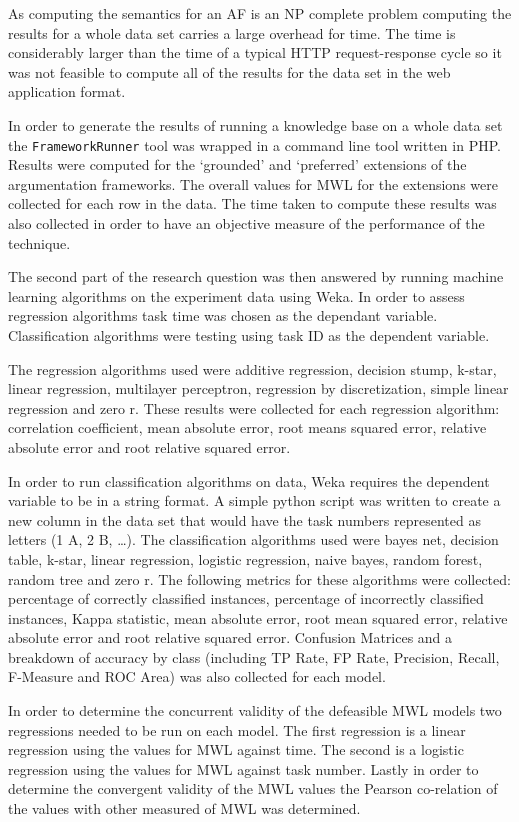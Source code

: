As computing the semantics for an AF is an NP complete problem computing the results for a whole data set carries a large overhead for time. The time is considerably larger than the time of a typical HTTP request-response cycle so it was not feasible to compute all of the results for the data set in the web application format. 

In order to generate the results of running a knowledge base on a whole data set the \lstinline{FrameworkRunner} tool was wrapped in a command line tool written in PHP. Results were computed for the `grounded' and `preferred' extensions of the argumentation frameworks. The overall values for MWL for the extensions were collected for each row in the data. The time taken to compute these results was also collected in order to have an objective measure of the performance of the technique.

The second part of the research question was then answered by running machine learning algorithms on the experiment data using Weka. In order to assess regression algorithms task time was chosen as the dependant variable. Classification algorithms were testing using task ID as the dependent variable.

The regression algorithms used were additive regression, decision stump, k-star, linear regression, multilayer perceptron, regression by discretization, simple linear regression and zero r.
These results were collected for each regression algorithm: correlation coefficient, mean absolute error, root means squared error, relative absolute error and root relative squared error.

In order to run classification algorithms on data, Weka requires the dependent variable to be in a string format. A simple python script was written to create a new column in the data set that would have the task numbers represented as letters (1 \leftarrow A, 2 \leftarrow B, \ldots).
The classification algorithms used were bayes net, decision table, k-star, linear regression, logistic regression, naive bayes, random forest, random tree and zero r. The following metrics for these algorithms were collected: percentage of correctly classified instances, percentage of incorrectly classified instances, Kappa statistic, mean absolute error, root mean squared error, relative absolute error and root relative squared error. Confusion Matrices and a breakdown of accuracy by class (including TP Rate, FP Rate, Precision, Recall, F-Measure and ROC Area) was also collected for each model.

In order to determine the concurrent validity of the defeasible MWL models two regressions needed to be run on each model. The first regression is a linear regression using the values for MWL against time. The second is a logistic regression using the values for MWL against task number. Lastly in order to determine the convergent validity of the MWL values the Pearson co-relation of the values with other measured of MWL was determined.

